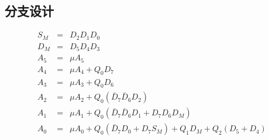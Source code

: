 \documentclass[10pt]{book}
\begin{document}
\subsection{分支设计}
\begin{eqnarray}
S_M &=& D_2D_1D_0 \\
D_M &=& D_5D_4D_3 \\
A_5 &=& \mu A_5 \\
A_4 &=& \mu A_4 + Q_0D_7\\
A_3 &=& \mu A_3 + Q_0D_6\\
A_2 &=& \mu A_2 + Q_0(\bar D_7\bar D_6D_2) \\
A_1 &=& \mu A_1 + Q_0(\bar D_7\bar D_6D_1+D_7D_6D_M) \\
A_0 &=& \mu A_0 + Q_0(\bar D_7D_0+D_7S_M)+Q_1D_M+Q_2(D_5+D_4)
\end{eqnarray}
\end{document}

